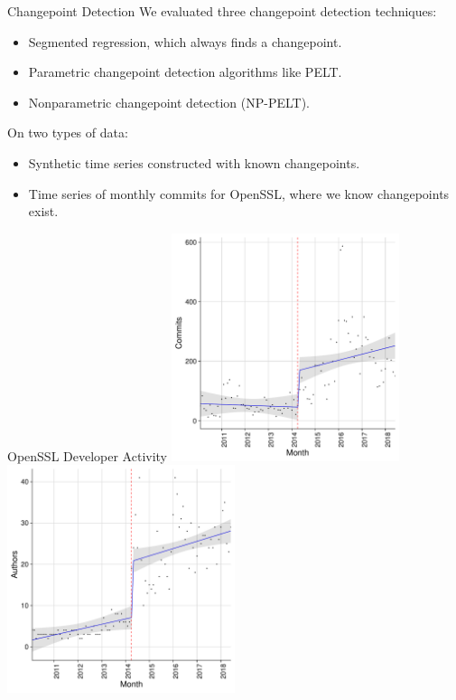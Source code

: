 \documentclass[11pt,handout]{beamer}
\begin{document}
\begin{frame}{Changepoint Detection}
We evaluated three changepoint detection techniques:
    \begin{itemize}
        \item Segmented regression, which always finds a changepoint.
        \item Parametric changepoint detection algorithms like PELT.
        \item Nonparametric changepoint detection (NP-PELT).
    \end{itemize}
On two types of data:
    \begin{itemize}
        \item Synthetic time series constructed with known changepoints.
        \item Time series of monthly commits for OpenSSL, where we know changepoints exist.
    \end{itemize}
\end{frame}

\begin{frame}{OpenSSL Developer Activity}
    \includegraphics[width=0.5\textwidth,keepaspectratio]{ncommits.pdf}%
    \includegraphics[width=0.5\textwidth,keepaspectratio]{nauthors.pdf}
\end{frame}
\end{document}
